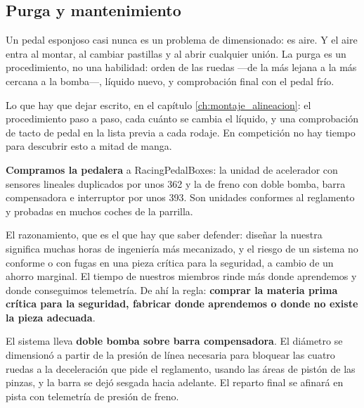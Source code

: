 \subsection{Purga y mantenimiento}

\begin{clave}
Un pedal esponjoso casi nunca es un problema de dimensionado: es aire. Y el aire
entra al montar, al cambiar pastillas y al abrir cualquier unión. La purga es un
procedimiento, no una habilidad: orden de las ruedas ---de la más lejana a la
más cercana a la bomba---, líquido nuevo, y comprobación final con el pedal
frío.

Lo que hay que dejar escrito, en el capítulo \ref{ch:montaje_alineacion}: el
procedimiento paso a paso, cada cuánto se cambia el líquido, y una comprobación
de tacto de pedal en la lista previa a cada rodaje. En competición no hay tiempo
para descubrir esto a mitad de manga.
\end{clave}


\begin{caso}
\textbf{Compramos la pedalera} a RacingPedalBoxes: la unidad de acelerador con
sensores lineales duplicados por unos \SI{362}{\EUR} y la de freno con doble
bomba, barra compensadora e interruptor por unos \SI{393}{\EUR}. Son unidades
conformes al reglamento y probadas en muchos coches de la parrilla.

El razonamiento, que es el que hay que saber defender: diseñar la nuestra
significa muchas horas de ingeniería más mecanizado, y el riesgo de un sistema
no conforme o con fugas en una pieza crítica para la seguridad, a cambio de un
ahorro marginal. El tiempo de nuestros miembros rinde más donde aprendemos y
donde conseguimos telemetría. De ahí la regla: \textbf{comprar la materia prima
crítica para la seguridad, fabricar donde aprendemos o donde no existe la pieza
adecuada}.

El sistema lleva \textbf{doble bomba sobre barra compensadora}. El diámetro se
dimensionó a partir de la presión de línea necesaria para bloquear las cuatro
ruedas a la deceleración que pide el reglamento, usando las áreas de pistón de
las pinzas, y la barra se dejó sesgada hacia adelante. El reparto final se
afinará en pista con telemetría de presión de freno.

\medskip
{}
\end{caso}

